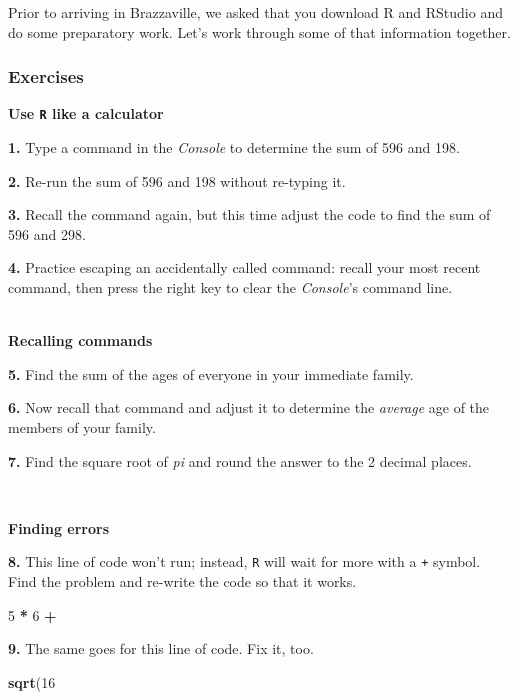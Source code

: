 \documentclass[
]{book}
\newenvironment{Shaded}{\begin{snugshade}}{\end{snugshade}}
\newcommand{\DecValTok}[1]{\textcolor[rgb]{0.00,0.00,0.81}{#1}}
\newcommand{\FunctionTok}[1]{\textcolor[rgb]{0.13,0.29,0.53}{\textbf{#1}}}
\newcommand{\NormalTok}[1]{#1}
\newcommand{\SpecialCharTok}[1]{\textcolor[rgb]{0.81,0.36,0.00}{\textbf{#1}}}
\begin{document}
Prior to arriving in Brazzaville, we asked that you download R and RStudio and do some preparatory work. Let's work through some of that information together.

\subsubsection*{Exercises}\label{exercises-1}

\textbf{Use \texttt{R} like a calculator}

\textbf{1.} Type a command in the \emph{Console} to determine the sum of 596 and 198.

\textbf{2.} Re-run the sum of 596 and 198 without re-typing it.

\textbf{3.} Recall the command again, but this time adjust the code to find the sum of 596 and 298.

\textbf{4.} Practice escaping an accidentally called command: recall your most recent command, then press the right key to clear the \emph{Console}'s command line.

~\\
\textbf{Recalling commands}

\textbf{5.} Find the sum of the ages of everyone in your immediate family.

\textbf{6.} Now recall that command and adjust it to determine the \emph{average} age of the members of your family.

\textbf{7.} Find the square root of \emph{pi} and round the answer to the 2 decimal places.

~

\textbf{Finding errors}

\textbf{8.} This line of code won't run; instead, \texttt{R} will wait for more with a \texttt{+} symbol. Find the problem and re-write the code so that it works.

\begin{Shaded}
\begin{Highlighting}[]
\DecValTok{5} \SpecialCharTok{*} \DecValTok{6} \SpecialCharTok{+}
\end{Highlighting}
\end{Shaded}

\textbf{9.} The same goes for this line of code. Fix it, too.

\begin{Shaded}
\begin{Highlighting}[]
\FunctionTok{sqrt}\NormalTok{(}\DecValTok{16}
\end{Highlighting}
\end{Shaded}
\end{document}
